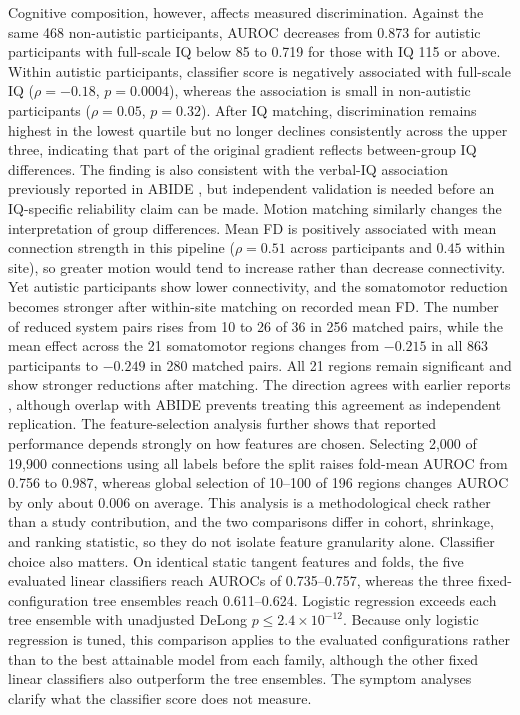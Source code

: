 Cognitive composition, however, affects measured discrimination. Against the same 468 non-autistic participants, AUROC decreases from 0.873 for autistic participants with full-scale IQ below 85 to 0.719 for those with IQ 115 or above. Within autistic participants, classifier score is negatively associated with full-scale IQ ($\rho=-0.18$, $p=0.0004$), whereas the association is small in non-autistic participants ($\rho=0.05$, $p=0.32$). After IQ matching, discrimination remains highest in the lowest quartile but no longer declines consistently across the upper three, indicating that part of the original gradient reflects between-group IQ differences. The finding is also consistent with the verbal-IQ association previously reported in ABIDE \citep{Nielsenetal2013}, but independent validation is needed before an IQ-specific reliability claim can be made. Motion matching similarly changes the interpretation of group differences. Mean FD is positively associated with mean connection strength in this pipeline ($\rho=0.51$ across participants and $0.45$ within site), so greater motion would tend to increase rather than decrease connectivity. Yet autistic participants show lower connectivity, and the somatomotor reduction becomes stronger after within-site matching on recorded mean FD. The number of reduced system pairs rises from 10 to 26 of 36 in 256 matched pairs, while the mean effect across the 21 somatomotor regions changes from $-0.215$ in all 863 participants to $-0.249$ in 280 matched pairs. All 21 regions remain significant and show stronger reductions after matching. The direction agrees with earlier reports \citep{Chenetal2015,Holigaetal2019,Ilioskaetal2023}, although overlap with ABIDE prevents treating this agreement as independent replication. The feature-selection analysis further shows that reported performance depends strongly on how features are chosen. Selecting 2,000 of 19,900 connections using all labels before the split raises fold-mean AUROC from 0.756 to 0.987, whereas global selection of 10--100 of 196 regions changes AUROC by only about 0.006 on average. This analysis is a methodological check rather than a study contribution, and the two comparisons differ in cohort, shrinkage, and ranking statistic, so they do not isolate feature granularity alone. Classifier choice also matters. On identical static tangent features and folds, the five evaluated linear classifiers reach AUROCs of 0.735--0.757, whereas the three fixed-configuration tree ensembles reach 0.611--0.624. Logistic regression exceeds each tree ensemble with unadjusted DeLong $p\le2.4\times10^{-12}$. Because only logistic regression is tuned, this comparison applies to the evaluated configurations rather than to the best attainable model from each family, although the other fixed linear classifiers also outperform the tree ensembles. The symptom analyses clarify what the classifier score does not measure. 

